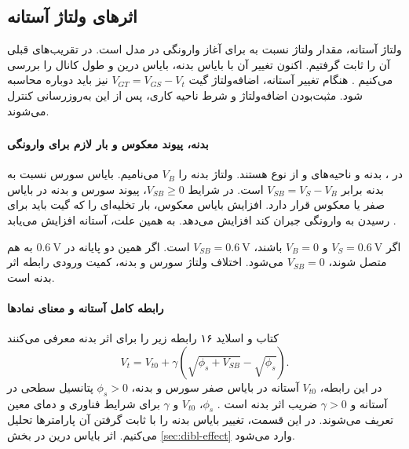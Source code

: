\subsection{اثرهای ولتاژ آستانه}
\label{sec:threshold-effects}
ولتاژ آستانه، مقدار ولتاژ  نسبت به  برای آغاز وارونگی
در مدل است. در تقریب‌های قبلی آن را ثابت گرفتیم. اکنون تغییر آن با بایاس
بدنه، بایاس درین و طول کانال را بررسی می‌کنیم
\cite[بخش ]{weste}\cite[اسلاید ۱۵]{nonideal}.
هنگام تغییر آستانه، اضافه‌ولتاژ گیت \(V_{GT}=V_{GS}-V_t\) نیز باید
دوباره محاسبه شود. مثبت‌بودن اضافه‌ولتاژ و شرط ناحیه کاری، پس از این
به‌روزرسانی کنترل می‌شوند.

\subsubsection{}
\label{sec:body-effect}
\paragraph*{بدنه، پیوند معکوس و بار لازم برای وارونگی}
در ، بدنه  و ناحیه‌های  و
 از نوع  هستند. ولتاژ بدنه را \(V_B\) می‌نامیم.
بایاس سورس نسبت به بدنه برابر \(V_{SB}=V_S-V_B\) است. در شرایط
\(V_{SB}\ge0\)، پیوند سورس و بدنه در بایاس صفر یا معکوس قرار دارد.
افزایش بایاس معکوس، بار تخلیه‌ای را که گیت باید برای رسیدن به وارونگی
جبران کند افزایش می‌دهد. به همین علت، آستانه افزایش می‌یابد
\cite[بخش ]{weste}\cite[اسلاید ۱۶]{nonideal}.

اگر \(V_S=\qty{0.6}{\volt}\) و \(V_B=0\) باشند،
\(V_{SB}=\qty{0.6}{\volt}\) است. اگر همین دو پایانه در
\(\qty{0.6}{\volt}\) به هم متصل شوند، \(V_{SB}=0\) می‌شود.
اختلاف ولتاژ سورس و بدنه، کمیت ورودی رابطه اثر بدنه است.

\paragraph*{رابطه کامل آستانه و معنای نمادها}
کتاب و اسلاید ۱۶ رابطه زیر را برای اثر بدنه معرفی می‌کنند
\begin{equation}
 \boxed{V_t=V_{t0}+\gamma
 \left(\sqrt{\phi_s+V_{SB}}-\sqrt{\phi_s}\right)}.
 \label{eq:threshold-body}
\end{equation}
در این رابطه، \(V_{t0}\) آستانه در بایاس صفر سورس و بدنه،
\(\phi_s>0\) پتانسیل سطحی در آستانه و \(\gamma>0\) ضریب اثر بدنه
است \cite[رابطه ]{weste}. \(\phi_s\)، \(V_{t0}\) و
\(\gamma\) برای شرایط فناوری و دمای معین تعریف می‌شوند.
در این قسمت، تغییر بایاس بدنه را با ثابت گرفتن آن پارامترها تحلیل می‌کنیم.
اثر بایاس درین در بخش \ref{sec:dibl-effect} وارد می‌شود.

